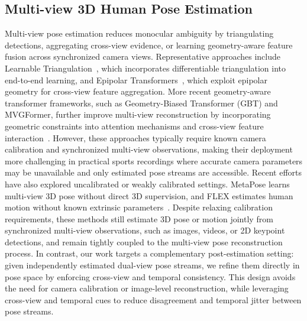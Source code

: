 \documentclass[sigconf,screen]{acmart}
\begin{document}
\subsection{Multi-view 3D Human Pose Estimation}
Multi-view pose estimation reduces monocular ambiguity by triangulating detections, aggregating cross-view evidence, or learning geometry-aware feature fusion across synchronized camera views. Representative approaches include Learnable Triangulation~\cite{iskakov2019learnable}, which incorporates differentiable triangulation into end-to-end learning, and Epipolar Transformers~\cite{he2020epipolar}, which exploit epipolar geometry for cross-view feature aggregation. More recent geometry-aware transformer frameworks, such as Geometry-Biased Transformer (GBT) and MVGFormer, further improve multi-view reconstruction by incorporating geometric constraints into attention mechanisms and cross-view feature interaction~\cite{venkat2023geometry,liao2024multiple}. However, these approaches typically require known camera calibration and synchronized multi-view observations, making their deployment more challenging in practical sports recordings where accurate camera parameters may be unavailable and only estimated pose streams are accessible. Recent efforts have also explored uncalibrated or weakly calibrated settings. MetaPose learns multi-view 3D pose without direct 3D supervision, and FLEX estimates human motion without known extrinsic parameters~\cite{usman2022metapose,gordon2022flex}. Despite relaxing calibration requirements, these methods still estimate 3D pose or motion jointly from synchronized multi-view observations, such as images, videos, or 2D keypoint detections, and remain tightly coupled to the multi-view pose reconstruction process. In contrast, our work targets a complementary post-estimation setting: given independently estimated dual-view pose streams, we refine them directly in pose space by enforcing cross-view and temporal consistency. This design avoids the need for camera calibration or image-level reconstruction, while leveraging cross-view and temporal cues to reduce disagreement and temporal jitter between pose streams.
\end{document}
